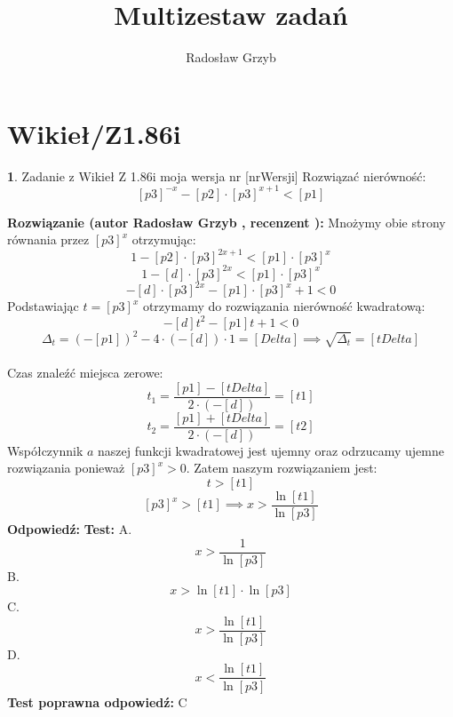\documentclass[12pt, a4paper]{article}
\title{Multizestaw zadań}
\author{Radosław Grzyb}
\date{}
\theoremstyle{definition} %
\newtheorem{zad}{}
\newcommand{\kategoria}[1]{\section{#1}} %
\newcommand{\zadStart}[1]{\begin{zad}#1\newline} %
\newcommand{\zadStop}{\end{zad}}   %
\newcommand{\rozwStart}[2]{\noindent \textbf{Rozwiązanie (autor #1 , recenzent #2): }\newline} %
\newcommand{\rozwStop}{\newline}                                            %
\newcommand{\odpStart}{\noindent \textbf{Odpowiedź:}\newline}    %
\newcommand{\odpStop}{\newline}                                             %
\newcommand{\testStart}{\noindent \textbf{Test:}\newline} %
\newcommand{\testStop}{\newline} %
\newcommand{\kluczStart}{\noindent \textbf{Test poprawna odpowiedź:}\newline} %
\newcommand{\kluczStop}{\newline} %
\begin{document}
\maketitle
\kategoria{Wikieł/Z1.86i}
\zadStart{Zadanie z Wikieł Z 1.86i moja wersja nr [nrWersji]}
Rozwiązać nierówność:
$$[p3]^{-x}-[p2]\cdot[p3]^{x+1}<[p1]$$
\zadStop
\rozwStart{Radosław Grzyb}{}
Mnożymy obie strony równania przez $[p3]^x$ otrzymując:
$$1-[p2]\cdot[p3]^{2x+1}<[p1]\cdot[p3]^x$$
$$1-[d]\cdot[p3]^{2x}<[p1]\cdot[p3]^x$$
$$-[d]\cdot[p3]^{2x}-[p1]\cdot[p3]^x+1<0$$
Podstawiając $t=[p3]^x$ otrzymamy do rozwiązania nierówność kwadratową:
$$-[d]t^{2}-[p1]t+1<0$$
$$\Delta_{t}=(-[p1])^2-4\cdot(-[d])\cdot1=[Delta]\implies \sqrt{\Delta_{t}}=[tDelta]$$\\
Czas znaleźć miejsca zerowe:
$$t_{1}=\frac{[p1]-[tDelta]}{2\cdot(-[d])}=[t1]$$
$$t_{2}=\frac{[p1]+[tDelta]}{2\cdot(-[d])}=[t2]$$
Współczynnik $a$ naszej funkcji kwadratowej jest ujemny oraz odrzucamy ujemne rozwiązania ponieważ $[p3]^x>0$. Zatem naszym rozwiązaniem jest:
$$t>[t1]$$
$$[p3]^x>[t1]\implies x>\frac{\ln[t1]}{\ln[p3]}$$
\rozwStop
\odpStart
\odpStop
\testStart
A.$$x>\frac{1}{\ln[p3]}$$
B.$$x>\ln[t1]\cdot\ln[p3]$$
C.$$x>\frac{\ln[t1]}{\ln[p3]}$$
D.$$x<\frac{\ln[t1]}{\ln[p3]}$$
\testStop
\kluczStart
C
\kluczStop
\end{document}
